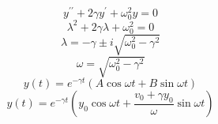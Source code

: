 \documentclass{article}
\begin{document}
\[
y^{\prime\prime}+2\gamma y^{\prime}+\omega_0^2y=0
\]
\[
\lambda^2+2\gamma\lambda+\omega_0^2=0
\]
\[
\lambda=-\gamma\pm i\sqrt{\omega_0^2-\gamma^2}
\]
\[
\omega=\sqrt{\omega_0^2-\gamma^2}
\]
\[
y(t)=e^{-\gamma t}(A\cos\omega t+B\sin\omega t)
\]
\[
y(t)=e^{-\gamma t}\left(y_0\cos\omega t+\frac{v_0+\gamma y_0}{\omega}\sin\omega t\right)
\]
\end{document}
